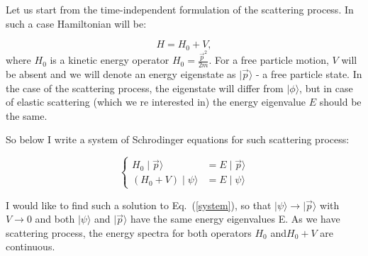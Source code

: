 



    Let us start from the time-independent formulation of the scattering process.
    In such a case Hamiltonian will be:

    \begin{equation}
        H = H_0 + V,
    \end{equation}
    where $H_0$ is a kinetic energy operator $H_0 = \frac{\vec{p}^2}{2m}$.
    For a free particle motion, $V$ will be absent and we will denote an energy eigenstate as
    $\mid \vec{p} \rangle$ - a free particle state.
    In the case of the scattering process, the eigenstate will differ from $\mid \phi \rangle$,
    but in case of elastic scattering (which we re interested in) the energy eigenvalue $E$ should be the same.

    So below I write a system of Schrodinger equations for such scattering process:

    \begin{equation}
        \begin{cases}
            H_0 \mid \vec{p} \rangle &= E \mid \vec{p} \rangle \\
            (H_0 + V) \mid \psi \rangle &= E \mid \psi \rangle
        \end{cases}
        \label{system}
    \end{equation}

    I would like to find such a solution to Eq.~(\ref{system}), so that 
    $\mid \psi \rangle \rightarrow \mid \vec{p} \rangle$ with $V \rightarrow 0$
    and both $\mid \psi \rangle$ and $\mid \vec{p} \rangle$ have the same energy eigenvalues E.
    As we have scattering process, the energy spectra for both operators $H_0$ and$H_0 + V$
    are continuous. 

